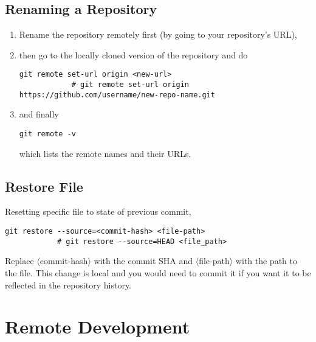 \documentclass[12pt, a4paper]{article}
\numberwithin{equation}{section}
\theoremstyle{definition}
\theoremstyle{definition}
\begin{document}
	\subsection{Renaming a Repository}
	
	\begin{enumerate}
		\item Rename the repository remotely first (by going to your repository's URL), 
		\item then go to the locally cloned version of the repository and do
		
		\begin{lstlisting}[style=mystylebash, label=alg:git__rename_repo, xleftmargin=\parindent]
			git remote set-url origin <new-url>
			# git remote set-url origin https://github.com/username/new-repo-name.git 
		\end{lstlisting}
		
		\item and finally 
		
		\begin{lstlisting}[style=mystylebash, label=alg:git__check_remote_url, xleftmargin=\parindent]
			git remote -v
		\end{lstlisting}
		
		which lists the remote names and their URLs.
		
	\end{enumerate}

	\subsection{Restore File}
	
		Resetting specific file to state of previous commit,
		
		\begin{lstlisting}[style=mystylebash, label=alg:git_restore, xleftmargin=\parindent]
			git restore --source=<commit-hash> <file-path>
			# git restore --source=HEAD <file_path>
		\end{lstlisting}
		
		\noindent Replace $\langle$commit-hash$\rangle$ with the commit SHA and $\langle$file-path$\rangle$ with the path to the file. This change is local and you would need to commit it if you want it to be reflected in the repository history.
	
	\newpage 
	
	\section{Remote Development}
	
\end{document}
